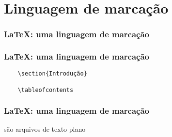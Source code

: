 \section[\LaTeX: uma linguagem de marcação]{Linguagem de marcação}

\begin{frame}
  \frametitle{\LaTeX: uma linguagem de marcação}
  \LARGE
\end{frame}

\begin{frame}[fragile]
  \frametitle{\LaTeX: uma linguagem de marcação}
  \begin{verbatim}
    \section{Introdução}

    \tableofcontents
  \end{verbatim}
\end{frame}

\begin{frame}
  \frametitle{\LaTeX: uma linguagem de marcação}
  \LARGE
   são arquivos de texto plano
\end{frame}
